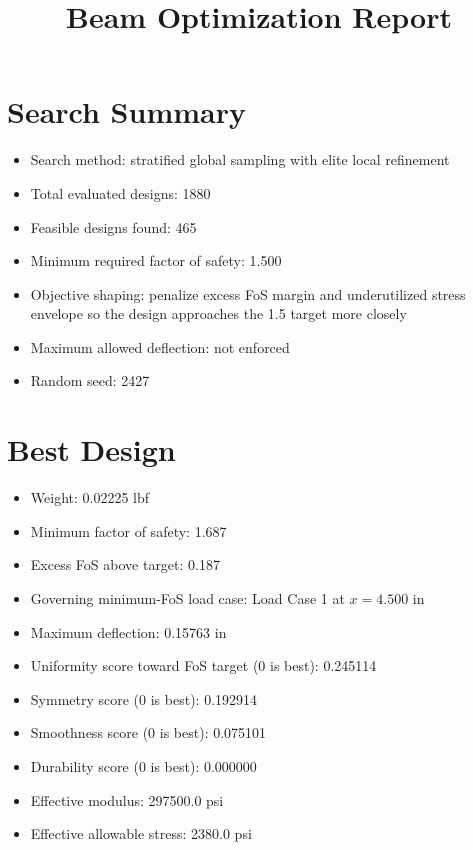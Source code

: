 \documentclass[11pt]{article}
\title{Beam Optimization Report}
\date{}
\begin{document}
\maketitle

\section*{Search Summary}
\begin{itemize}
\item Search method: stratified global sampling with elite local refinement
\item Total evaluated designs: 1880
\item Feasible designs found: 465
\item Minimum required factor of safety: 1.500
\item Objective shaping: penalize excess FoS margin and underutilized stress envelope so the design approaches the 1.5 target more closely
\item Maximum allowed deflection: not enforced
\item Random seed: 2427
\end{itemize}

\section*{Best Design}
\begin{itemize}
\item Weight: 0.02225 lbf
\item Minimum factor of safety: 1.687
\item Excess FoS above target: 0.187
\item Governing minimum-FoS load case: Load Case 1 at $x=4.500$ in
\item Maximum deflection: 0.15763 in
\item Uniformity score toward FoS target (0 is best): 0.245114
\item Symmetry score (0 is best): 0.192914
\item Smoothness score (0 is best): 0.075101
\item Durability score (0 is best): 0.000000
\item Effective modulus: 297500.0 psi
\item Effective allowable stress: 2380.0 psi
\end{itemize}
\end{document}
